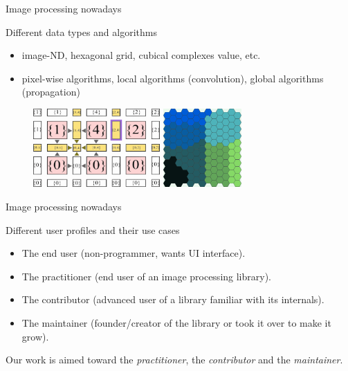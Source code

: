 \documentclass[12pt,aspectratio=169]{beamer}
\begin{document}
\begin{frame}[fragile]{Image processing nowadays}
  \begin{alertblock}{Different data types and algorithms}
    \begin{itemize}
      \item image-ND, hexagonal grid, cubical complexes value, etc.
      \item pixel-wise algorithms, local algorithms (convolution), global algorithms (propagation)
    \end{itemize}
  \end{alertblock}
  \begin{figure}[bl]
    \hfill
    \includegraphics[height=3cm]{../illustrations/cubical_complex.pdf}
    \hfill
    \includegraphics[height=3cm]{../illustrations/hexagonal_grid2.pdf}
    \hspace{1cm}
  \end{figure}
\end{frame}

\begin{frame}[fragile]{Image processing nowadays}
  \begin{alertblock}{Different user profiles and their use cases}
    \begin{itemize}
      \item The end user (non-programmer, wants UI interface).
      \item The practitioner (end user of an image processing library).
      \item The contributor (advanced user of a library familiar with its internals).
      \item The maintainer (founder/creator of the library or took it over to make it grow).
    \end{itemize}
  \end{alertblock}

  Our work is aimed toward the \emph{practitioner}, the \emph{contributor} and the \emph{maintainer}.
\end{frame}
\end{document}
